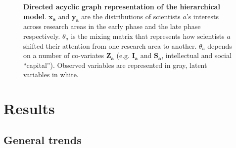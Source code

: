 \documentclass{article}
\begin{document}
\begin{figure}[h]
    \centering
    \caption{\textbf{Directed acyclic graph representation of the hierarchical model}. $\bm{x_a}$ and $\bm{y_a}$ are the distributions of scientists $a$'s interests across research areas in the early phase and the late phase respectively. $\theta_a$ is the mixing matrix that represents how scientists $a$ shifted their attention from one research area to another. $\theta_a$ depends on a number of co-variates $\bm{Z_a}$ (e.g. $\bm{I_a}$ and $\bm{S_a}$, intellectual and social ``capital''). Observed variables are represented in gray, latent variables in white.}
    \label{fig:model_structure}
\end{figure}


 \section{\label{sec:results}Results}

 \subsection{\label{sec:macro}General trends}
\end{document}
